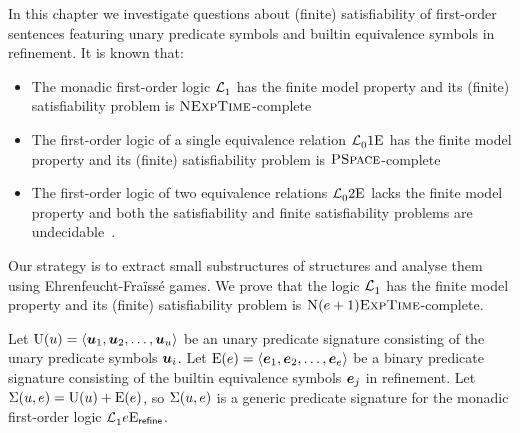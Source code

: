
In this chapter we investigate questions about (finite) satisfiability of
first-order sentences featuring unary predicate symbols and builtin equivalence
symbols in refinement.
It is known that:
\begin{itemize}
  \item The monadic first-order logic $\mathcal{L}^{{}}_{1}$ has the finite model
  property and its (finite) satisfiability problem is
  $\text{\normalfont{\scshape NExpTime}}$-complete~\cite{Lowenheim1915}
  \item The first-order logic of a single equivalence relation
  $\mathcal{L}^{{}}_{0}{1}\mathrm{E}_{{}}$ has the finite model property and its (finite)
  satisfiability problem is $\text{\normalfont{\scshape PSpace}}$-complete~\cite{boerger1997classical}
  \item The first-order logic of two equivalence relations
  $\mathcal{L}^{{}}_{0}{2}\mathrm{E}_{{}}$ lacks the finite model property and both the
  satisfiability and finite satisfiability problems are
  undecidable~\cite{Janiczak1953}.
\end{itemize}
Our strategy is to extract small substructures of structures and analyse them
using Ehrenfeucht-Fra\"{i}ss\'{e} games.
We prove that the logic $\mathcal{L}^{{}}_{1}$ has the finite model property and its
(finite) satisfiability problem is $\text{\normalfont{\scshape N}}(e+1)\text{\normalfont{\scshape ExpTime}}$-complete.

Let ${\mathrm{U}}(u) = \left\langle \bm{u}_{1},\bm{u}_{2},\dots,\bm{u}_{u} \right\rangle$ be an unary predicate
signature consisting of the unary predicate symbols $\bm{u}_{i}$.
Let ${\mathrm{E}}(e) = \left\langle \bm{e}_{1},\bm{e}_{2},\dots,\bm{e}_{e} \right\rangle$ be a binary predicate
signature consisting of the builtin equivalence symbols $\bm{e}_{j}$ in refinement.
Let $\mathrm{\Sigma}(u,e) = {\mathrm{U}}(u) + {\mathrm{E}}(e)$, so $\mathrm{\Sigma}(u,e)$ is a generic
predicate signature for the monadic first-order logic
$\mathcal{L}^{{}}_{1}{e}\mathrm{E}_{\mathsf{refine}}$.